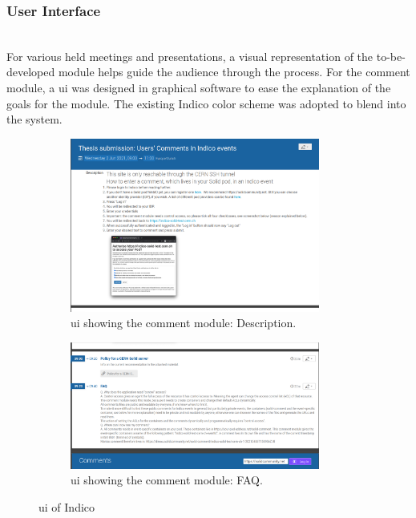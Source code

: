\subsubsection{User Interface}\mbox{}\\

For various held meetings and presentations, a visual representation of the to-be-developed module helps guide the audience through the process. For the comment module, a \gls{ui} was designed in graphical software to ease the explanation of the goals for the module. The existing Indico color scheme was adopted to blend into the system.

\begin{figure}
    \centering
    \begin{subfigure}{.5\textwidth}
      \centering
        \includegraphics[width=0.9\textwidth]{prototype/poc-solid-comment-description.png}
        \caption{\gls{ui} showing the comment module: Description.}
        \label{fig:poc-solid-comment-description}
    \end{subfigure}%
    \begin{subfigure}{.5\textwidth}
      \centering
    \includegraphics[width=0.9\textwidth]{prototype/poc-solid-comment-agenda.png}
    \caption{\gls{ui} showing the comment module: FAQ.}
    \label{fig:poc-solid-comment-agenda}
    \end{subfigure}
    \caption{\gls{ui} of Indico}
    \label{fig:test}
\end{figure}

